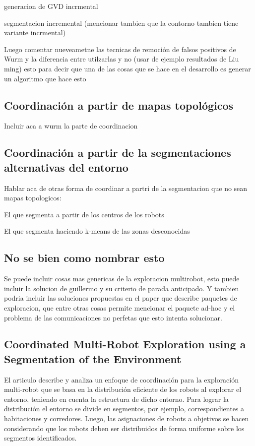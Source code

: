 generacion de GVD incrmental

segmentacion incremental (mencionar tambien que la contorno tambien tiene variante incrmental)

Luego comentar nueveametne las tecnicas de remoción de falsos positivos de Wurm y la diferencia entre utilzarlas y no (usar de ejemplo resultados de Liu ming) esto para decir que una de las cosas que se hace en el desarrollo es generar un algoritmo que hace esto


\subsection{Coordinación a partir de mapas topológicos}
Incluir aca a wurm la parte de coordinacion

\subsection{Coordinación a partir de la segmentaciones alternativas del entorno}
Hablar aca de otras forma de coordinar a partri de la segmentacion que no sean mapas topologicos:

El que segmenta a partir de los centros de los robots

El que segmenta haciendo k-means de las zonas desconocidas

\subsection{No se bien como nombrar esto}
Se puede incluir cosas mas genericas de la exploracion multirobot, esto puede incluir la solucion de guillermo y su criterio de parada anticipado. Y tambien podria incluir las soluciones propuestas en el paper que describe paquetes de exploracion, que entre otras cosas permite mencionar el paquete ad-hoc y el problema de las comunicaciones no perfetas que esto intenta solucionar.

\subsection[Coordinated Multi-Robot Exploration using a Segmentation of the Environment]{Coordinated Multi-Robot Exploration using a\\ Segmentation of the Environment}

\cite{wurm2008coordinated}
El articulo describe y analiza un enfoque de coordinación para la exploración multi-robot que se basa en la distribución eficiente de los robots al explorar el entorno, teniendo en cuenta la estructura de dicho entorno. Para lograr la distribución el entorno se divide en segmentos, por ejemplo, correspondientes a habitaciones y corredores. Luego, las asignaciones de robots a objetivos se hacen considerando que los robots deben ser distribuidos de forma uniforme sobre los segmentos identificados. 

